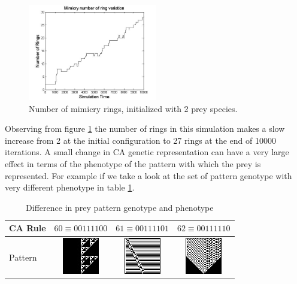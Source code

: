 \documentclass[letterpaper]{article}
\numberwithin{equation}{section}
\begin{document}
\begin{figure}[H]
	\centering
	\includegraphics[width=0.5\textwidth]{../tex/images/ringSize10k-2Prey}
	\caption[Number of mimicry rings (2 prey species)]{Number of mimicry rings, initialized with 2 prey species.}
	\label{fig:ringSize10k-2Prey}
\end{figure}

Observing from figure \ref{fig:ringSize10k-2Prey} the number of rings in this simulation makes a slow increase from 2 at the initial configuration to 27 rings at the end of 10000 iterations. A small change in CA genetic representation can have a very large effect in terms of the phenotype of the pattern with which the prey is represented. For example if we take a look at the set of pattern genotype with very different phenotype in table \ref{tab:diff-in-pattern}.

\begin{table}[h]
\centering
\begin{tabular}{|l|c|c|c|}
  \hline
  CA Rule & \(60 \equiv 00111100\) & \(61 \equiv 00111101\) & \(62 \equiv 00111110 \) \\ \hline
  Pattern & \parbox[c]{2.1em}{\includegraphics[scale=0.50]{../tex/images/CARule60}} 
  				& \parbox[c]{2.1em}{\includegraphics[scale=0.50]{../tex/images/CARule61}} 
  				& \parbox[c]{2.1em}{\includegraphics[scale=0.50]{../tex/images/CARule62}}\\
  \hline
\end{tabular}
\caption{Difference in prey pattern genotype and phenotype}
\label{tab:diff-in-pattern}
\end{table}
\end{document}
